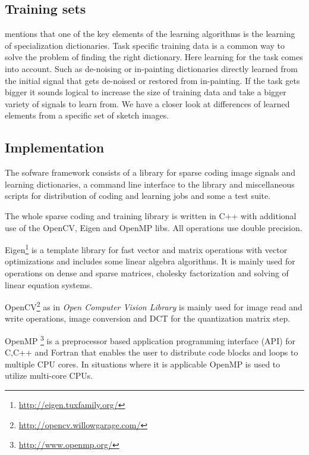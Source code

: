 \subsection{Training sets}
 mentions that one of the key
elements of the learning algorithms is the learning of specialization
dictionaries. Task specific training data is a common way to solve the problem
of finding  the right dictionary. Here learning for the task comes into
account. Such as de-noising or in-painting dictionaries directly learned from
the initial signal that gets de-noised or restored from in-painting. If the task
gets bigger it sounds logical to increase the size of training data and take a
bigger variety of signals to learn from.  We have a closer look at differences
of learned elements from a specific set of sketch images.

\subsection{Implementation}
The sofware framework consists of a library for sparse coding image signals 
and learning dictionaries, a command line interface to the library and
miscellaneous scripts for distribution of coding and learning jobs and
some a test suite.

The whole sparse coding and training library is written in C++ with
additional use of the OpenCV, Eigen and OpenMP libs. All operations use double
precision. 

Eigen\footnote{\url{http://eigen.tuxfamily.org/}}
is a template library for fast vector and matrix operations with vector
optimizations and includes some linear algebra algorithms. It is mainly used for
operations on dense and sparse matrices, cholesky factorization and solving of
linear equation systems. 

OpenCV\footnote{\url{http://opencv.willowgarage.com/}} as
in \emph{Open Computer Vision Library} is mainly used for
image read and write operations, image conversion and DCT for the
quantization matrix step. 

OpenMP \footnote{\url{http://www.openmp.org/}} is a preprocessor
based application programming interface (API) for C,C++ and Fortran that enables
the user to distribute code blocks and loops to multiple CPU cores. In
situations where it is applicable OpenMP is used to utilize multi-core CPUs. 


